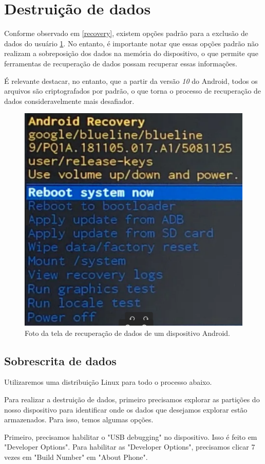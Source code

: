 \newpage

\section{Destruição de dados}

Conforme observado em \ref{recovery}, existem opções padrão para a exclusão de dados do usuário \ref{fig:recovery}. No entanto, é importante notar que essas opções padrão não realizam a sobreposição dos dados na memória do dispositivo, o que permite que ferramentas de recuperação de dados possam recuperar essas informações.

É relevante destacar, no entanto, que a partir da versão \emph{10} do Android, todos os arquivos são criptografados por padrão, o que torna o processo de recuperação de dados consideravelmente mais desafiador.

\begin{figure}[h]
    \centering
    \includegraphics[width=0.5\columnwidth]{images/recovery.png}
    \caption{Foto da tela de recuperação de dados de um dispositivo Android.}
    \label{fig:recovery}
\end{figure}

\subsection{Sobrescrita de dados}

Utilizaremos uma distribuição Linux para todo o processo abaixo.

Para realizar a destruição de dados, primeiro precisamos explorar as partições do nosso dispositivo para identificar onde os dados que desejamos explorar estão armazenados. Para isso, temos algumas opções.

Primeiro, precisamos habilitar o "USB debugging" no dispositivo. Isso é feito em "Developer Options". Para habilitar as "Developer Options", precisamos clicar 7 vezes em "Build Number" em "About Phone".

